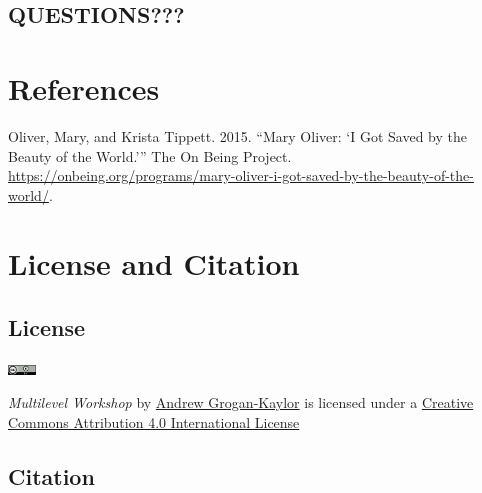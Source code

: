 \documentclass[
  letterpaper,
  DIV=11,
  numbers=noendperiod]{scrreprt}
\newlength{\cslhangindent}
\newenvironment{CSLReferences}[2] %
 {\begin{list}{}{%
  \setlength{\itemindent}{0pt}
  \setlength{\leftmargin}{0pt}
  \setlength{\parsep}{0pt}
  \ifodd #1
   \setlength{\leftmargin}{\cslhangindent}
   \setlength{\itemindent}{-1\cslhangindent}
  \fi
  \setlength{\itemsep}{#2\baselineskip}}}
 {\end{list}}
\begin{document}
\section{QUESTIONS???}\label{questions}


\chapter*{References}\label{references}


\label{refs}
\begin{CSLReferences}{1}{0}
Oliver, Mary, and Krista Tippett. 2015. {``{M}ary {O}liver: {`{I} Got
Saved by the Beauty of the World.'}''} The On Being Project.
\url{https://onbeing.org/programs/mary-oliver-i-got-saved-by-the-beauty-of-the-world/}.

\end{CSLReferences}


\chapter*{License and Citation}\label{license-and-citation}


\section*{License}\label{license}


\includegraphics[width=0.29in,height=\textheight,keepaspectratio]{88x31.png}

\emph{Multilevel Workshop} by \href{https://agrogan1.github.io/}{Andrew
Grogan-Kaylor} is licensed under a
\href{http://creativecommons.org/licenses/by/4.0/}{Creative Commons
Attribution 4.0 International License}

\section*{Citation}\label{citation}
\end{document}
